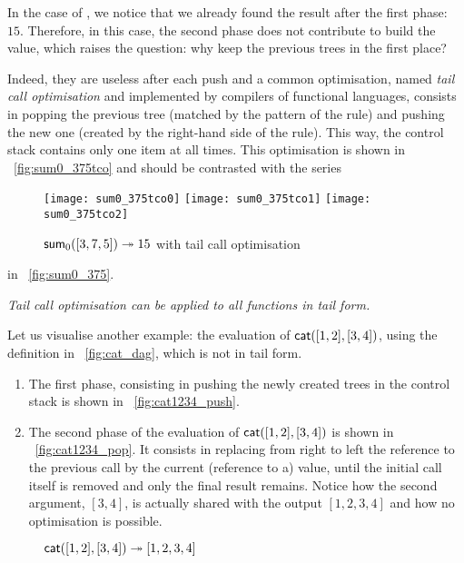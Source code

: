 In the case of , we notice that we already found the
result after the first phase:~\(15\). Therefore, in this case, the
second phase does not contribute to build the value, which raises the
question: why keep the previous trees in the first place?

Indeed, they are useless after each push and a common optimisation,
named \emph{tail call optimisation} and implemented by compilers of
functional languages, consists in popping the previous tree (matched
by the pattern of the rule) and pushing the new one (created by the
right\hyp{}hand side of the rule). This way, the control stack
contains only one item at all times. This optimisation is shown in
\fig~\vref{fig:sum0_375tco} and should be contrasted with the series
\begin{figure}[!t]
\centering
\texttt{[image: sum0\_375tco0]}
\texttt{[image: sum0\_375tco1]}
\texttt{[image: sum0\_375tco2]}
\caption{\(\textsf{sum}_0([3,7,5]) \twoheadrightarrow 15\) with tail call
  optimisation\label{fig:sum0_375tco}}
\end{figure}
in \fig~\vref{fig:sum0_375}.

\emph{Tail call optimisation can be applied to all functions in tail
  form.}

Let us visualise another example: the evaluation of
\(\textsf{cat}([1,2],[3,4])\), using the definition in
\fig~\vref{fig:cat_dag}, which is not in tail form.
\begin{enumerate}

  \item The first phase, consisting in pushing the newly created trees
    in the control stack is shown in \fig~\vref{fig:cat1234_push}.

  \item The second phase of the evaluation of
    \(\textsf{cat}([1,2],[3,4])\) is shown in
    \fig~\vref{fig:cat1234_pop}. It consists in replacing from right
    to left the reference to the previous call by the current
    (reference to a) value, until the initial call itself is removed
    and only the final result remains. Notice how the second argument,
    \([3,4]\), is actually shared with the output \([1,2,3,4]\) and
    how no optimisation is possible.
\end{enumerate}
\begin{figure}[!t]
\centering
{}
\vskip32pt
{}
\caption{\(\textsf{cat}([1,2],[3,4]) \twoheadrightarrow [1,2,3,4]\)} %
\end{figure}

